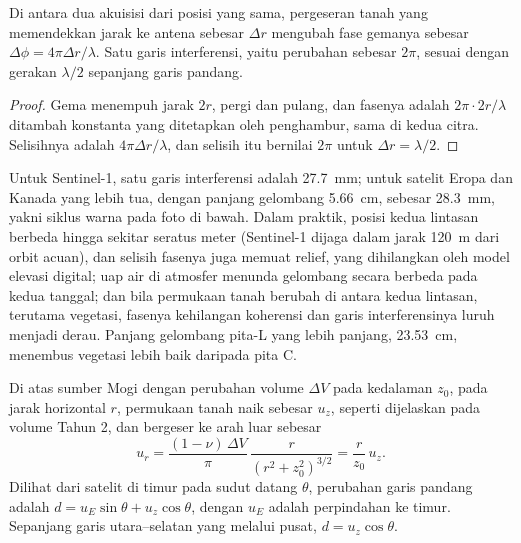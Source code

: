 \begin{theorem}\label{thm:b3:remote-sensing-gis:fringe}
Di antara dua akuisisi dari posisi yang sama, pergeseran tanah yang memendekkan
jarak ke antena sebesar $\Delta r$ mengubah
fase gemanya sebesar $\Delta\phi = 4\pi\Delta r/\lambda$. Satu garis interferensi, yaitu
perubahan sebesar $2\pi$, sesuai dengan gerakan $\lambda/2$ sepanjang garis pandang.
\end{theorem}

\begin{proof}
Gema menempuh jarak $2r$, pergi dan pulang, dan fasenya adalah
$2\pi\cdot 2r/\lambda$ ditambah konstanta yang ditetapkan oleh penghambur, sama di
kedua citra. Selisihnya adalah $4\pi\Delta r/\lambda$, dan selisih itu bernilai $2\pi$
untuk $\Delta r = \lambda/2$.
\end{proof}

Untuk Sentinel-1, satu garis interferensi adalah \qty{27.7}{mm}; untuk satelit Eropa dan
Kanada yang lebih tua, dengan panjang gelombang \qty{5.66}{cm}, sebesar \qty{28.3}{mm}, yakni
siklus warna pada foto di bawah. Dalam praktik, posisi kedua lintasan
berbeda hingga sekitar seratus meter (Sentinel-1 dijaga
dalam jarak \qty{120}{m} dari orbit acuan), dan selisih fasenya
juga memuat relief, yang dihilangkan oleh model elevasi digital; uap
air di atmosfer menunda gelombang secara berbeda pada kedua tanggal;
dan bila permukaan tanah berubah di antara kedua lintasan, terutama vegetasi,
fasenya kehilangan koherensi dan garis interferensinya luruh menjadi derau. Panjang
gelombang pita-L yang lebih panjang, \qty{23.53}{cm}, menembus vegetasi lebih baik
daripada pita C.

\begin{proposition}\label{prop:b3:remote-sensing-gis:mogi-los}
Di atas sumber Mogi dengan perubahan volume $\Delta V$ pada kedalaman $z_0$, pada
jarak horizontal $r$, permukaan tanah naik sebesar $u_z$, seperti dijelaskan pada
volume Tahun 2, dan bergeser ke arah luar sebesar
\[
u_r = \frac{(1 - \nu)\,\Delta V}{\pi}\,\frac{r}{(r^2 + z_0^2)^{3/2}} = \frac{r}{z_0}\,u_z .
\]
Dilihat dari satelit di timur pada sudut datang $\theta$, perubahan
garis pandang adalah $d = u_E\sin\theta + u_z\cos\theta$, dengan $u_E$
adalah perpindahan ke timur. Sepanjang garis utara--selatan yang melalui pusat,
$d = u_z\cos\theta$.
\end{proposition}

